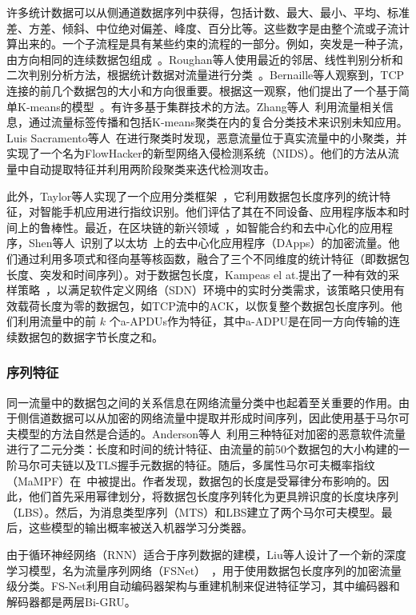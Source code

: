 \documentclass[degree=master,cjk-font=noto]{thuthesis}
\begin{document}
许多统计数据可以从侧通道数据序列中获得，包括计数、最大、最小、平均、标准差、方差、倾斜、中位绝对偏差、峰度、百分比等。这些数字是由整个流或子流计算出来的。一个子流程是具有某些约束的流程的一部分。例如，突发是一种子流，由方向相同的连续数据包组成~\cite{SSFW10}。Roughan等人使用最近的邻居、线性判别分析和二次判别分析方法，根据统计数据对流量进行分类~\cite{b11}。Bernaille等人观察到，TCP连接的前几个数据包的大小和方向很重要。根据这一观察，他们提出了一个基于简单K-means的模型~\cite{b12}。有许多基于集群技术的方法。Zhang等人~\cite{b15}利用流量相关信息，通过流量标签传播和包括K-means聚类在内的复合分类技术来识别未知应用。Luis Sacramento等人~\cite{flowhacker}在进行聚类时发现，恶意流量位于真实流量中的小聚类，并实现了一个名为FlowHacker的新型网络入侵检测系统（NIDS）。他们的方法从流量中自动提取特征并利用两阶段聚类来迭代检测攻击。

此外，Taylor等人实现了一个应用分类框架~\cite{app_class}，它利用数据包长度序列的统计特征，对智能手机应用进行指纹识别。他们评估了其在不同设备、应用程序版本和时间上的鲁棒性。最近，在区块链的新兴领域~\cite{chen2019tokenscope,EOS20}，如智能合约和去中心化的应用程序，Shen等人~\cite{DApps}识别了以太坊~\cite{8486401}上的去中心化应用程序（DApps）的加密流量。他们通过利用多项式和径向基等核函数，融合了三个不同维度的统计特征（即数据包长度、突发和时间序列）。对于数据包长度，Kampeas el at.提出了一种有效的采样策略~\cite{zero_length}，以满足软件定义网络（SDN）环境中的实时分类需求，该策略只使用有效载荷长度为零的数据包，如TCP流中的ACK，以恢复整个数据包长度序列。他们利用流量中的前 $k$ 个a-APDUs作为特征，其中a-ADPU是在同一方向传输的连续数据包的数据字节长度之和。

\subsubsection{序列特征}

同一流量中的数据包之间的关系信息在网络流量分类中也起着至关重要的作用。由于侧信道数据可以从加密的网络流量中提取并形成时间序列，因此使用基于马尔可夫模型的方法自然是合适的。Anderson等人~\cite{kdd_encrypted_malware}利用三种特征对加密的恶意软件流量进行了二元分类：长度和时间的统计特征、由流量的前50个数据包的大小构建的一阶马尔可夫链以及TLS握手元数据的特征。随后，多属性马尔可夫概率指纹（MaMPF）在~\cite{MaMPF}中被提出。作者发现，数据包的长度是受幂律分布影响的。因此，他们首先采用幂律划分，将数据包长度序列转化为更具辨识度的长度块序列（LBS）。然后，为消息类型序列（MTS）和LBS建立了两个马尔可夫模型。最后，这些模型的输出概率被送入机器学习分类器。

由于循环神经网络（RNN）适合于序列数据的建模，Liu等人设计了一个新的深度学习模型，名为流量序列网络（FSNet）~\cite{fsnet}，用于使用数据包长度序列的加密流量级分类。FS-Net利用自动编码器架构与重建机制来促进特征学习，其中编码器和解码器都是两层Bi-GRU。
\end{document}
